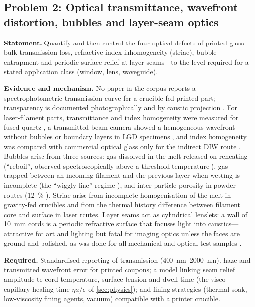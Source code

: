 \subsection{Problem 2: Optical transmittance, wavefront distortion, bubbles and layer-seam optics}
\textbf{Statement.} Quantify and then control the four optical defects of printed glass---bulk transmission loss, refractive-index inhomogeneity (striae), bubble entrapment and periodic surface relief at layer seams---to the level required for a stated application class (window, lens, waveguide).

\textbf{Evidence and mechanism.} No paper in the corpus reports a spectrophotometric transmission curve for a crucible-fed printed part; transparency is documented photographically and by caustic projection \citep{klein2015,inamura2018}. For laser-filament parts, transmittance and index homogeneity were measured for fused quartz \citep{luo2018quartz}, a transmitted-beam camera showed a homogeneous wavefront without bubbles or boundary layers in LGD specimens \citep{lgd2024homog}, and index homogeneity was compared with commercial optical glass only for the indirect DIW route \citep{destino2018}. Bubbles arise from three sources: gas dissolved in the melt released on reheating (``reboil'', observed spectroscopically above a threshold temperature \citep{luo2017heat}), gas trapped between an incoming filament and the previous layer when wetting is incomplete (the ``wiggly line'' regime \citep{kth2022bonding}), and inter-particle porosity in powder routes (\SI{12}{\percent} \citep{datsiou2021}). Striae arise from incomplete homogenisation of the melt in gravity-fed crucibles and from the thermal history difference between filament core and surface in laser routes. Layer seams act as cylindrical lenslets: a wall of \SI{10}{mm} cords is a periodic refractive surface that focuses light into caustics---attractive for art and lighting \citep{brun2017,commons_caustics} but fatal for imaging optics unless the faces are ground and polished, as was done for all mechanical and optical test samples \citep{klein2015,mit2024masonry}.

\textbf{Required.} Standardised reporting of transmission (\SIrange{400}{2000}{nm}), haze and transmitted wavefront error for printed coupons; a model linking seam relief amplitude to cord temperature, surface tension and dwell time (the visco-capillary healing time \(\eta a/\sigma\) of \cref{sec:physics}); and fining strategies (thermal soak, low-viscosity fining agents, vacuum) compatible with a printer crucible.

